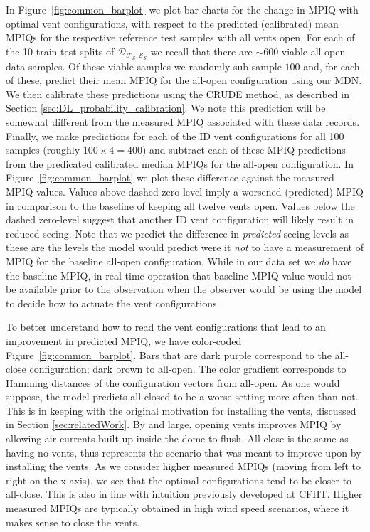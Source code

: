 In Figure~\ref{fig:common_barplot} we plot bar-charts for the change in MPIQ with optimal vent configurations, with respect to the predicted (calibrated) mean MPIQs for the respective reference test samples with all vents open. For each of the 10 train-test splits of $\mathcal{D_{F_S,S_S}}$ we recall that there are $\sim600$ viable all-open data samples.  Of these viable samples we randomly sub-sample $100$ and, for each of these, predict their mean MPIQ for the all-open configuration using our MDN. We then calibrate these predictions using the CRUDE method, as described in Section \ref{sec:DL_probability_calibration}. We note this prediction will be somewhat different from the measured MPIQ associated with these data records. Finally, we make predictions for each of the ID vent configurations for all 100 samples (roughly $100 \times 4 = 400$) and subtract each of these MPIQ predictions from the predicated calibrated median MPIQs for the all-open configuration.  In Figure~\ref{fig:common_barplot} we plot these difference against the measured MPIQ values. Values above dashed zero-level imply a worsened (predicted) MPIQ in comparison to the baseline of keeping all twelve vents open.  Values below the dashed zero-level suggest that another ID vent configuration will likely result in reduced seeing. Note that we predict the difference in {\it predicted} seeing levels as these are the levels the model would predict were it {\it not} to have a measurement of MPIQ for the baseline all-open configuration.  While in our data set we {\it do} have the baseline MPIQ, in real-time operation that baseline MPIQ value would not be available prior to the observation when the observer would be using the model to decide how to actuate the vent configurations.

To better understand how to read the vent configurations that lead to an improvement in predicted MPIQ, we have color-coded Figure~\ref{fig:common_barplot}. Bars that are dark purple correspond to the all-close configuration; dark brown to all-open. The color gradient corresponds to Hamming distances of the configuration vectors from all-open.  As one would suppose, the model predicts all-closed to be a worse setting more often than not.  This is in keeping with the original motivation for installing the vents, discussed in Section \ref{sec:relatedWork}.  By and large, opening vents improves MPIQ by allowing air currents built up inside the dome to flush. All-close is the same as having no vents, thus represents the  scenario that was meant to improve upon by installing the vents. As we consider higher measured MPIQs (moving from left to right on the x-axis), we see that the optimal configurations tend to be closer to all-close. This is also in line with intuition previously developed at CFHT.  Higher measured MPIQs are typically obtained in high wind speed scenarios, where it makes sense to close the vents.

